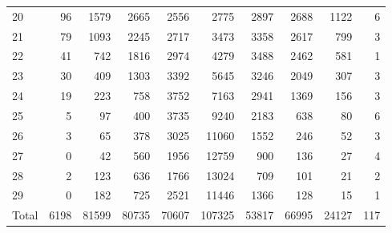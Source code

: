\begin{table}
\begin{tabular}{lrrrrrrrrr}
20 & 96 & 1579 & 2665 & 2556 & 2775 & 2897 & 2688 & 1122 & 6 \\
21 & 79 & 1093 & 2245 & 2717 & 3473 & 3358 & 2617 & 799 & 3 \\
22 & 41 & 742 & 1816 & 2974 & 4279 & 3488 & 2462 & 581 & 1 \\
23 & 30 & 409 & 1303 & 3392 & 5645 & 3246 & 2049 & 307 & 3 \\
24 & 19 & 223 & 758 & 3752 & 7163 & 2941 & 1369 & 156 & 3 \\
25 & 5 & 97 & 400 & 3735 & 9240 & 2183 & 638 & 80 & 6 \\
26 & 3 & 65 & 378 & 3025 & 11060 & 1552 & 246 & 52 & 3 \\
27 & 0 & 42 & 560 & 1956 & 12759 & 900 & 136 & 27 & 4 \\
28 & 2 & 123 & 636 & 1766 & 13024 & 709 & 101 & 21 & 2 \\
29 & 0 & 182 & 725 & 2521 & 11446 & 1366 & 128 & 15 & 1 \\
Total & 6198 & 81599 & 80735 & 70607 & 107325 & 53817 & 66995 & 24127 & 117 \\
\end{tabular}
\end{table}
